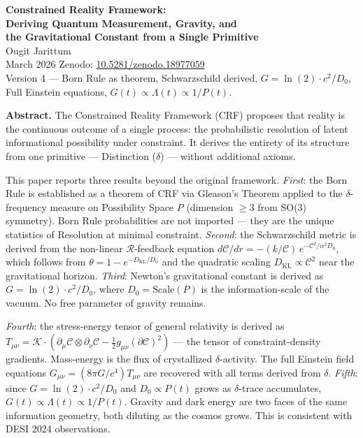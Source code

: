 \documentclass[12pt]{article}
\begin{document}
\begin{center}
{\LARGE\bfseries\color{navyblue}
Constrained Reality Framework:}\\[0.5em]
{\Large\bfseries\color{navyblue}
Deriving Quantum Measurement, Gravity, and\\
the Gravitational Constant from a Single Primitive}\\[0.7em]
{\normalsize Ougit Jarittum}\\[0.3em]
{\small\color{mutedgray} March 2026 \quad
Zenodo: \href{https://doi.org/10.5281/zenodo.18977059}
{10.5281/zenodo.18977059}}\\[0.4em]
{\small\color{mutedgray} Version 4 ---
Born Rule as theorem, Schwarzschild derived,
$G = \ln(2)\cdot c^2/D_0$, Full Einstein equations,
$G(t) \propto \Lambda(t) \propto 1/P(t)$.}
\end{center}

\bigskip

\noindent\textbf{Abstract.}
The Constrained Reality Framework (CRF) proposes that reality is the
continuous outcome of a single process: the probabilistic resolution of
latent informational possibility under constraint. It derives the
entirety of its structure from one primitive --- Distinction ($\delta$)
--- without additional axioms.

This paper reports three results beyond the original framework.
\textit{First}: the Born Rule is established as a theorem of CRF via
Gleason's Theorem applied to the $\delta$-frequency measure on
Possibility Space $P$ (dimension $\geq 3$ from SO(3) symmetry). Born
Rule probabilities are not imported --- they are the unique statistics
of Resolution at minimal constraint.
\textit{Second}: the Schwarzschild metric is derived from the
non-linear $\mathcal{R}$-feedback equation
$d\mathcal{C}/dr = -(k/\mathcal{C})\,e^{-\mathcal{C}^2/\alpha^2 D_0}$,
which follows from $\theta = 1 - e^{-D_{\mathrm{KL}}/D_0}$ and the
quadratic scaling $D_{\mathrm{KL}} \propto \mathcal{C}^2$ near the
gravitational horizon.
\textit{Third}: Newton's gravitational constant is derived as
$G = \ln(2)\cdot c^2/D_0$, where $D_0 = \mathrm{Scale}(P)$ is the
information-scale of the vacuum. No free parameter of gravity remains.

\textit{Fourth}: the stress-energy tensor of general relativity is
derived as $T_{\mu\nu} = \mathcal{K}\cdot(\partial_\mu\mathcal{C}
\otimes \partial_\nu\mathcal{C} - \frac{1}{2}g_{\mu\nu}
(\partial\mathcal{C})^2)$ --- the tensor of constraint-density
gradients. Mass-energy is the flux of crystallized $\delta$-activity.
The full Einstein field equations $G_{\mu\nu} = (8\pi G/c^4)T_{\mu\nu}$
are recovered with all terms derived from $\delta$.
\textit{Fifth}: since $G = \ln(2)\cdot c^2/D_0$ and
$D_0 \propto P(t)$ grows as $\delta$-trace accumulates,
$G(t) \propto \Lambda(t) \propto 1/P(t)$. Gravity and dark energy
are two faces of the same information geometry, both diluting as
the cosmos grows. This is consistent with DESI 2024 observations.
\end{document}
